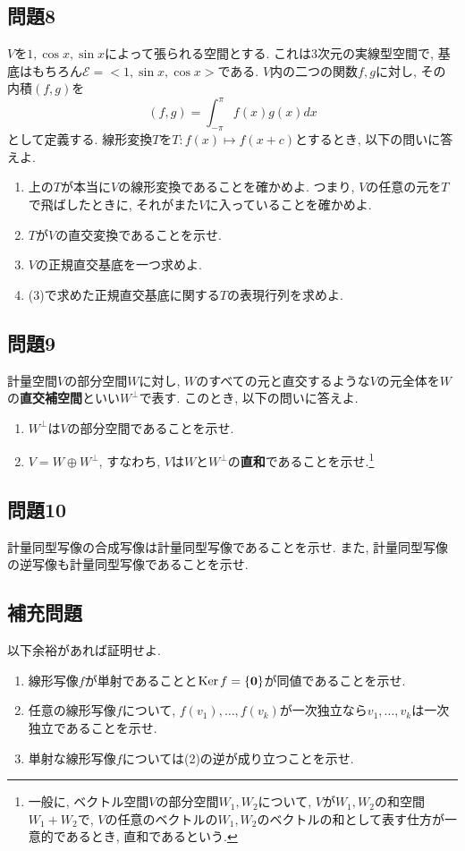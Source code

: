 \documentclass[a4j,dvipdfmx]{jsarticle}
\newcommand{\Ker}{\mathrm{Ker}\hspace{0.5mm}}
\newcommand{\E}{\mathcal{E}}
\begin{document}
    \subsection*{問題8}
        $V$を$1,\cos x,\sin x$によって張られる空間とする. これは3次元の実線型空間で, 基底はもちろん$\E=<1,\sin x,\cos x>$である. $V$内の二つの関数$f,g$に対し, その内積$(f,g)$を
        \begin{equation*}
            (f,g)=\int_{-\pi}^{\pi}f(x)g(x)dx
        \end{equation*}
        として定義する. 線形変換$T$を$T:f(x)\mapsto f(x+c)$とするとき, 以下の問いに答えよ.
        \begin{enumerate}
            \item 上の$T$が本当に$V$の線形変換であることを確かめよ. つまり, $V$の任意の元を$T$で飛ばしたときに, それがまた$V$に入っていることを確かめよ.
            \item $T$が$V$の直交変換であることを示せ.
            \item $V$の正規直交基底を一つ求めよ.
            \item (3)で求めた正規直交基底に関する$T$の表現行列を求めよ.
        \end{enumerate}
    \subsection*{問題9}
        計量空間$V$の部分空間$W$に対し, $W$のすべての元と直交するような$V$の元全体を$W$の\textbf{直交補空間}といい$W^{\bot}$で表す. このとき, 以下の問いに答えよ.
        \begin{enumerate}
            \item $W^{\bot}$は$V$の部分空間であることを示せ.
            \item $V=W\oplus W^{\bot}$, すなわち, $V$は$W$と$W^{\bot}$の\textbf{直和}であることを示せ.\footnote{一般に, ベクトル空間$V$の部分空間$W_1,W_2$について, $V$が$W_1,W_2$の和空間$W_1+W_2$で, $V$の任意のベクトルの$W_1,W_2$のベクトルの和として表す仕方が一意的であるとき, 直和であるという.}
        \end{enumerate}

    \subsection*{問題10}
        計量同型写像の合成写像は計量同型写像であることを示せ. また, 計量同型写像の逆写像も計量同型写像であることを示せ.
    
    \subsection*{補充問題}以下余裕があれば証明せよ.
        \begin{enumerate}
            \item 線形写像$f$が単射であることと$\Ker f=\{\bm{0}\}$が同値であることを示せ.
            \item 任意の線形写像$f$について, $f(v_1),\dots,f(v_k)$が一次独立なら$v_1,\dots,v_k$は一次独立であることを示せ.
            \item 単射な線形写像$f$については(2)の逆が成り立つことを示せ.
        \end{enumerate}
\end{document}
